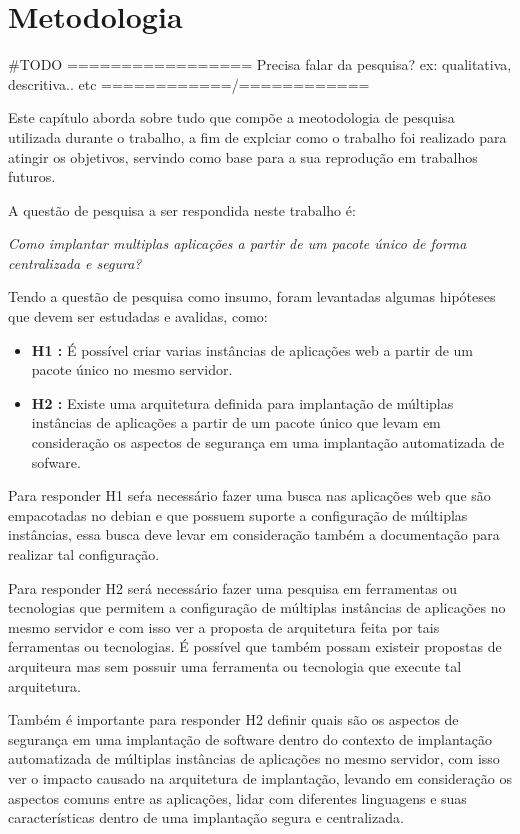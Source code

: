 \chapter{Metodologia}
\label{cap-metodologia}

#TODO
================= Precisa falar da pesquisa? ex: qualitativa, descritiva.. etc ============/============

Este capítulo aborda sobre tudo que compõe a meotodologia de pesquisa utilizada
durante o trabalho, a fim de explciar como o trabalho foi realizado para atingir os
objetivos, servindo como base para a sua reprodução em trabalhos futuros.

A questão de pesquisa a ser respondida neste trabalho é:

\begin{center}
  \textit{
    Como implantar multiplas aplicações a partir de um pacote único
    de forma centralizada e segura?
}
\end{center}

Tendo a questão de pesquisa como insumo, foram levantadas algumas hipóteses que devem
ser estudadas e avalidas, como:

\begin{itemize}
  \item  \textbf{H1 :} É possível criar varias instâncias de aplicações
  web a partir de um pacote único no mesmo servidor.
   \item  \textbf{H2 :} Existe uma arquitetura definida para implantação de
   múltiplas instâncias de aplicações a partir de um pacote único que levam em consideração
   os aspectos de segurança em uma implantação automatizada de sofware.
\end{itemize}

Para responder H1 seŕa necessário fazer uma busca nas aplicações web que são
empacotadas no debian e que possuem suporte a configuração de múltiplas instâncias,
essa busca deve levar em consideração também a documentação para realizar tal
configuração.

Para responder H2 será necessário fazer uma pesquisa em ferramentas ou tecnologias que
permitem a configuração de múltiplas instâncias de aplicações no mesmo servidor e com
isso ver a proposta de arquitetura feita por tais ferramentas ou tecnologias. É
possível que também possam existeir propostas de arquiteura mas sem possuir uma
ferramenta ou tecnologia que execute tal arquitetura.

Também é importante para responder H2 definir quais são os aspectos de segurança em
uma implantação de software dentro do contexto de implantação automatizada de múltiplas instâncias de aplicações no mesmo servidor,
com isso ver o impacto causado na arquitetura de implantação, levando em consideração os
aspectos comuns entre as aplicações, lidar com diferentes linguagens e suas características
dentro de uma implantação segura e centralizada.

